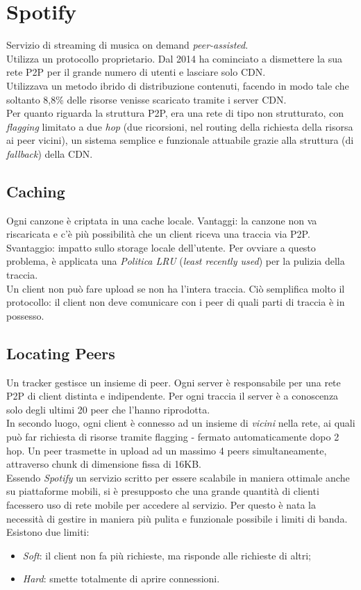 \section{Spotify}
Servizio di streaming di musica on demand \textit{peer-assisted}.\\
Utilizza un protocollo proprietario. Dal 2014 ha cominciato a dismettere la sua rete P2P per il grande numero di utenti e lasciare solo CDN. \\
Utilizzava un metodo ibrido di distribuzione contenuti, facendo in modo tale che soltanto 8,8\% delle risorse venisse scaricato tramite i server CDN. \\
Per quanto riguarda la struttura P2P, era una rete di tipo non strutturato, con \textit{flagging} limitato a due \textit{hop} (due ricorsioni, nel routing della richiesta della risorsa ai peer vicini), un sistema semplice e funzionale attuabile grazie alla struttura (di \textit{fallback}) della CDN.

\subsection{Caching}
Ogni canzone è criptata in una cache locale. Vantaggi: la canzone non va riscaricata e c'è più possibilità che un client riceva una traccia via P2P. Svantaggio: impatto sullo storage locale dell'utente. Per ovviare a questo problema, è applicata una \textit{Politica LRU} (\textit{least recently used}) per la pulizia della traccia. \\
Un client non può fare upload se non ha l'intera traccia. Ciò semplifica molto il protocollo: il client non deve comunicare con i peer di quali parti di traccia è in possesso.

\subsection{Locating Peers}
Un tracker gestisce un insieme di peer. Ogni server è responsabile per una rete P2P di client distinta e indipendente. Per ogni traccia il server è a conoscenza solo degli ultimi 20 peer che l'hanno riprodotta. \\
In secondo luogo, ogni client è connesso ad un insieme di \textit{vicini} nella rete, ai quali può far richiesta di risorse tramite flagging - fermato automaticamente dopo 2 hop.
Un peer trasmette in upload ad un massimo 4 peers simultaneamente, attraverso chunk di dimensione fissa di 16KB. \\
Essendo \textit{Spotify} un servizio scritto per essere scalabile in maniera ottimale anche su piattaforme mobili, si è presupposto che una grande quantità di clienti facessero uso di rete mobile per accedere al servizio. Per questo è nata la necessità di gestire in maniera più pulita e funzionale possibile i limiti di banda. Esistono due limiti:
\begin{itemize}
    \item \textit{Soft}: il client non fa più richieste, ma risponde alle richieste di altri;
    \item \textit{Hard}: smette totalmente di aprire connessioni.
\end{itemize}

